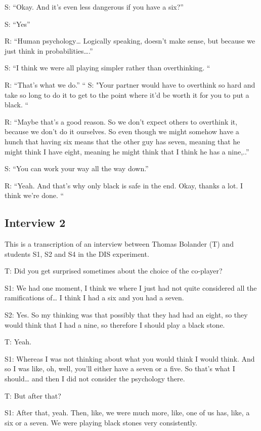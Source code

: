 \documentclass[a4paper,superscriptaddress,nofootinbib]{revtex4}
\begin{document}
S: “Okay. And it's even less dangerous if you have a six?”

S: “Yes”

R: “Human psychology… Logically speaking, doesn't make sense, but because we just think in probabilities….”

S: “I think we were all playing simpler rather than overthinking. “

R: “That's what we do.” 
“
S: "Your partner would have to overthink so hard and take so long to do it to get to the point where it'd be worth it for you to put a black. “

R: “Maybe that's a good reason. So we don't expect others to overthink it, because we don't do it ourselves. So even though we might somehow have a hunch that having six means that the other guy has seven, meaning that he might think I have eight, meaning he might think that I think he has a nine,..”

S: “You can work your way all the way down.”

R: “Yeah. And that's why only black is safe in the end. Okay, thanks a lot. I think we're done. “




\subsection*{Interview 2}
This is a transcription of an interview between Thomas Bolander (T) and students S1, S2 and S4 in the DIS experiment.

T: Did you get surprised sometimes about the choice of the co-player? 

S1: We had one moment, I think we where I just had not quite considered all the ramifications of… I think I had a six and you had a seven. 

S2: Yes. So my thinking was that possibly that they had had an eight, so they would think that I had a nine, so therefore I should play a black stone.

T: Yeah. 

S1: Whereas I was not thinking about what you would think I would think. And so I was like, oh, well, you'll either have a seven or a five. So that's what I should… and then I did not consider the psychology there.

T: But after that?

S1: After that, yeah. Then, like, we were much more, like, one of us has, like, a six or a seven. We were playing black stones very consistently. 
\end{document}
